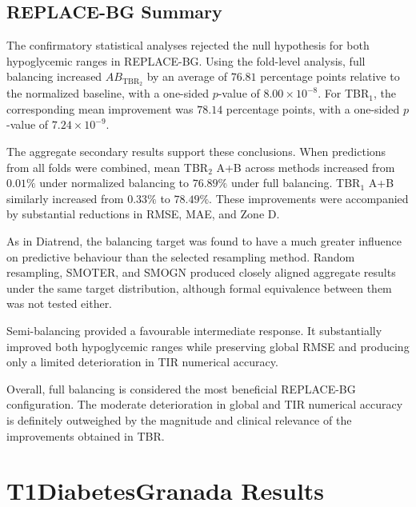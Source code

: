 \clearpage

\subsection{REPLACE-BG Summary}
\label{subsec:replacebg_summary}

The confirmatory statistical analyses rejected the null hypothesis for both hypoglycemic ranges in REPLACE-BG. Using the fold-level analysis, full balancing increased \(AB_{\mathrm{TBR_2}}\) by an average of \(76.81\) percentage points relative to the normalized baseline, with a one-sided \(p\)-value of \(8.00 \times 10^{-8}\). For TBR$_1$, the corresponding mean improvement was \(78.14\) percentage points, with a one-sided \(p\)-value of \(7.24 \times 10^{-9}\).

The aggregate secondary results support these conclusions. When predictions from all folds were combined, mean TBR$_2$ A+B across methods increased from \(0.01\%\) under normalized balancing to \(76.89\%\) under full balancing. TBR$_1$ A+B similarly increased from \(0.33\%\) to \(78.49\%\). These improvements were accompanied by substantial reductions in RMSE, MAE, and Zone D.

As in Diatrend, the balancing target was found to have a much greater influence on predictive behaviour than the selected resampling method. Random resampling, SMOTER, and SMOGN produced closely aligned aggregate results under the same target distribution, although formal equivalence between them was not tested either.

Semi-balancing provided a favourable intermediate response. It substantially improved both hypoglycemic ranges while preserving global RMSE and producing only a limited deterioration in TIR numerical accuracy.

Overall, full balancing is considered the most beneficial REPLACE-BG configuration. The moderate deterioration in global and TIR numerical accuracy is definitely outweighed by the magnitude and clinical relevance of the improvements obtained in TBR.


\section{T1DiabetesGranada Results}
\label{sec:t1diabetesgranadaresults}

